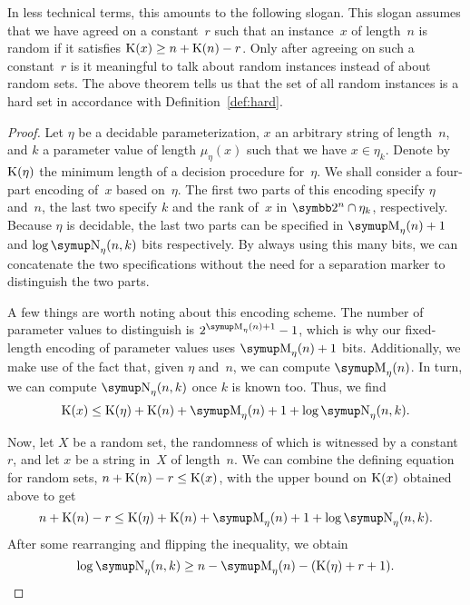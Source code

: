 In less technical terms, this amounts to the following slogan.
This slogan assumes that we have agreed on a constant~$r$ such that an instance~$x$ of length~$n$ is random if it satisfies $\operatorname{K}(x) \ge n + \operatorname{K}(n) - r$.
Only after agreeing on such a constant~$r$ is it meaningful to talk about random instances instead of about random sets.
The above theorem tells us that the set of all random instances is a hard set in accordance with Definition~\ref{def:hard}.
\begin{proof}
  Let $\eta$ be a decidable parameterization, $x$ an arbitrary string of length~$n$, and $k$ a parameter value of length $\mu_\eta(x)$ such that we have $x \in \eta_k$.
  Denote by $\operatorname{K}(\eta)$ the minimum length of a decision procedure for~$\eta$.
  We shall consider a four-part encoding of~$x$ based on~$\eta$.
  The first two parts of this encoding specify $\eta$ and~$n$, the last two specify $k$ and the rank of~$x$ in $\binary^n \cap \eta_k$, respectively.
  Because $\eta$ is decidable, the last two parts can be specified in $\upM_\eta(n) + 1$ and $\log \upN_\eta(n, k)$ bits respectively.
  By always using this many bits, we can concatenate the two specifications without the need for a separation marker to distinguish the two parts.

  A few things are worth noting about this encoding scheme.
  The number of parameter values to distinguish is $2^{\upM_\eta(n) + 1} - 1$, which is why our fixed-length encoding of parameter values uses $\upM_\eta(n) + 1$ bits.
  Additionally, we make use of the fact that, given $\eta$ and~$n$, we can compute $\upM_\eta(n)$.
  In turn, we can compute $\upN_\eta(n, k)$ once $k$ is known too.
  Thus, we find
  \begin{equation*}
    \KC(x) \le \KC(\eta) + \KC(n) + \upM_\eta(n) + 1 + \log \upN_\eta(n, k).
  \end{equation*}

  Now, let $X$ be a random set, the randomness of which is witnessed by a constant~$r$, and let $x$ be a string in~$X$ of length~$n$.
  We can combine the defining equation for random sets, $n + \operatorname{K}(n) - r \le \operatorname{K}(x)$, with the upper bound on $\operatorname{K}(x)$ obtained above to get
  \begin{equation*}
    n + \KC(n) - r \le \KC(\eta) + \KC(n) + \upM_\eta(n) + 1 + \log \upN_\eta(n, k).
  \end{equation*}
  After some rearranging and flipping the inequality, we obtain
  \begin{equation*}
    \log \upN_\eta(n, k) \ge n - \upM_\eta(n) - (\KC(\eta) + r + 1).
  \end{equation*}


\end{proof}

